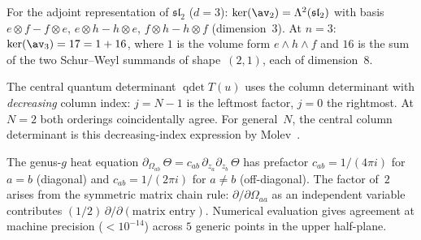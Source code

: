 \begin{remark}[Explicit kernel basis at $d = 3$]
\label{rem:ker-av-d3-explicit}
For the adjoint representation of $\mathfrak{sl}_2$
($d = 3$): $\ker(\av_2) = \Lambda^2(\mathfrak{sl}_2)$
with basis $e \otimes f - f \otimes e$,
$e \otimes h - h \otimes e$,
$f \otimes h - h \otimes f$ (dimension~$3$).
At $n = 3$: $\ker(\av_3) = 17 = 1 + 16$, where $1$
is the volume form $e \wedge h \wedge f$ and $16$ is
the sum of the two Schur--Weyl summands of shape~$(2,1)$, each of
dimension~$8$.
\end{remark}

\begin{remark}
\label{rem:qdet-column-ordering}
The central quantum determinant $\operatorname{qdet} T(u)$
uses the column determinant with \emph{decreasing} column
index: $j = N - 1$ is the leftmost factor, $j = 0$ the
rightmost. At $N = 2$ both orderings coincidentally agree.  For
general~$N$, the central column determinant is this decreasing-index
expression by Molev~\cite[Theorem~1.6.4]{Molev07}.
\end{remark}

\begin{remark}
\label{rem:kzb-heat-prefactor}
The genus-$g$ heat equation
$\partial_{\Omega_{ab}}\,\Theta = c_{ab}\,
\partial_{z_a}\partial_{z_b}\,\Theta$
has prefactor $c_{ab} = 1/(4\pi i)$ for $a = b$
(diagonal) and $c_{ab} = 1/(2\pi i)$ for $a \neq b$
(off-diagonal). The factor of~$2$ arises from the
symmetric matrix chain rule: $\partial/\partial\Omega_{aa}$
as an independent variable contributes
$(1/2)\,\partial/\partial(\text{matrix entry})$.
Numerical evaluation gives agreement at machine precision
($<10^{-14}$) across $5$ generic points in the upper half-plane.
\end{remark}

